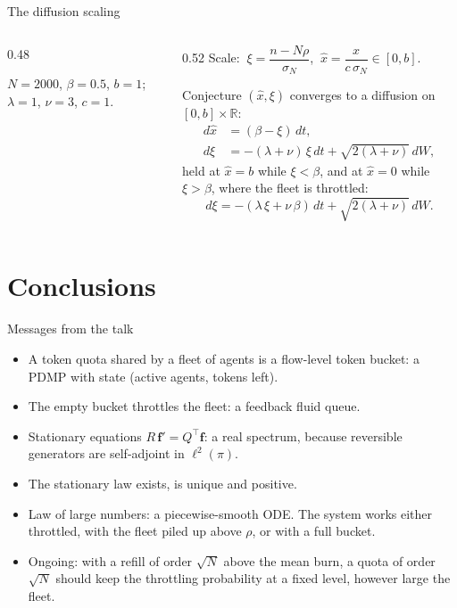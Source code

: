 \documentclass[aspectratio=169]{beamer}
\newcommand{\R}{\mathbb{R}}
\newcommand{\sN}{\sigma_N}
\newenvironment*{myitem}[1][1.5em]{\begin{itemize}\setlength{\itemsep}{#1}}{\end{itemize}}
\begin{document}
\begin{frame}{The diffusion scaling}

	\begin{columns}
		\begin{column}{0.48\textwidth}
			

			{\footnotesize $N=2000$, $\beta=0.5$, $b=1$; $\lambda=1$, $\nu=3$, $c=1$.}
		\end{column}
		\begin{column}{0.52\textwidth}
			Scale: $\ \xi = \dfrac{n-N\rho}{\sN}$, $\ \hat x = \dfrac{x}{c\,\sN}\in[0,b]$.

			\medskip
			\pause
			\begin{block}{Conjecture}
				\small
				$(\hat x,\xi)$ converges to a diffusion on $[0,b]\times\R$:
				\begin{align*}
					d\hat x &= (\beta-\xi)\,dt,\\
					d\xi &= -(\lambda+\nu)\,\xi\,dt + \sqrt{2(\lambda+\nu)}\,dW,
				\end{align*}
				held at $\hat x=b$ while $\xi<\beta$, and at $\hat x=0$ while $\xi>\beta$, where the fleet is throttled:
				\begin{equation*}
					d\xi = -(\lambda\,\xi+\nu\,\beta)\,dt + \sqrt{2(\lambda+\nu)}\,dW .
				\end{equation*}
			\end{block}
		\end{column}
	\end{columns}
\end{frame}

\section{Conclusions}

\begin{frame}{Messages from the talk}

	\begin{myitem}[1.1em]
		\item A token quota shared by a fleet of agents is a \alert{flow-level token bucket}: a PDMP with state (active agents, tokens left).
		\item The \alert{empty bucket throttles} the fleet: a feedback fluid queue.
		\item Stationary equations $R\,\mathbf f'=Q^\top\mathbf f$: a \alert{real} spectrum, because reversible generators are self-adjoint in $\ell^2(\pi)$.
		\item The stationary law exists, is unique and positive.
		\item \alert{Law of large numbers}: a piecewise-smooth ODE. The system works either throttled, with the fleet piled up above $\rho$, or with a full bucket.
		\item Ongoing: with a refill of order $\sqrt N$ above the mean burn, a quota of order $\sqrt N$ should keep the throttling probability at a \alert{fixed level}, however large the fleet.
	\end{myitem}
\end{frame}
\end{document}
